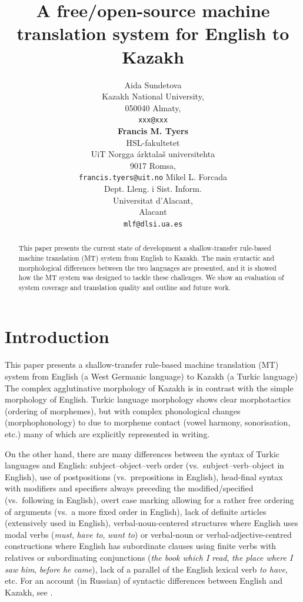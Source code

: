 \documentclass[11pt]{article}
\title{A free/open-source machine translation system for English to Kazakh}
\author{Aida Sundetova\\
  Kazakh National University,  \\
  050040 Almaty, \\
  {\tt xxx@xxx}\\
  \And
  \textbf{Francis M. Tyers}\\
  HSL-fakultetet\\ 
  UiT Norgga \'{a}rktala\v{s} universitehta \\
  9017 Romsa, \\
  {\tt francis.tyers@uit.no}
  \And
  Mikel L. Forcada\\
  Dept. Lleng. i Sist. Inform. \\
  Universitat d'Alacant, \\ 
  Alacant \\
  {\tt mlf@dlsi.ua.es}  
}
\date{}
\begin{document}
\maketitle 
\renewcommand{\baselinestretch}{0.97} %
 

\begin{abstract}
This paper presents the current state of development a shallow-transfer rule-based machine 
translation (MT) system from English to Kazakh. The main syntactic and morphological differences 
between the two languages are presented, and it is showed how the MT 
system was designed to tackle these challenges. We show an evaluation of system coverage and 
translation quality and outline and future work.
\end{abstract}

\section{Introduction}

This paper presents a shallow-transfer rule-based machine translation (MT) system from English 
(a West Germanic language) to Kazakh (a Turkic language)
The complex agglutinative morphology of Kazakh 
is in contrast with the simple morphology of English.
Turkic language morphology shows clear morphotactics (ordering of morphemes), but with 
complex phonological changes (morphophonology) to due to morpheme contact (vowel harmony, 
sonorisation, etc.) many of which are explicitly represented in writing.

On the other hand, there are many differences between the syntax of Turkic languages 
and English: subject–object–verb order (vs.\ subject–verb–object in English), use of 
postpositions (vs.\ prepositions in English), head-final syntax with modifiers and specifiers 
always preceding the modified/specified (vs.\ following in English), overt case marking allowing 
for a rather free ordering of arguments (vs.\ a more fixed order in English), lack of definite 
articles (extensively used in English), verbal-noun-centered structures where English uses modal 
verbs (\emph{must}, \emph{have to}, \emph{want to}) or verbal-noun or verbal-adjective-centred constructions where 
English has subordinate clauses using finite verbs with relatives or subordinating 
conjunctions (\emph{the book which I read}, \emph{the place where I saw him}, \emph{before he came}), lack of a parallel 
of the English lexical verb \emph{to have}, etc. For an account (in Russian) of 
syntactic differences between English and Kazakh, see \cite{pecherskih2012}.
\end{document}
